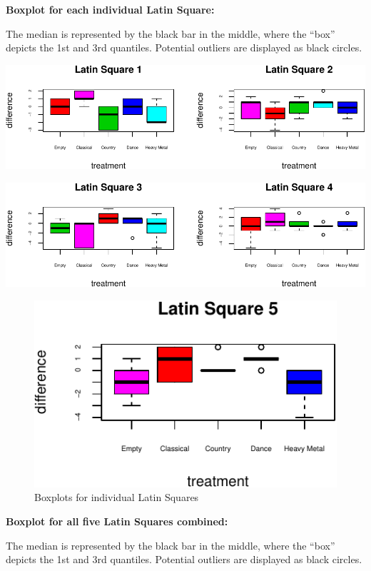 \documentclass[]{article}
\begin{document}
\textbf{Boxplot for each individual Latin Square:}

The median is represented by the black bar in the middle, where the
``box'' depicts the 1st and 3rd quantiles. Potential outliers are
displayed as black circles.

\includegraphics{STATS101B-Project-Code_files/figure-latex/unnamed-chunk-2-1.pdf}

\includegraphics{STATS101B-Project-Code_files/figure-latex/unnamed-chunk-3-1.pdf}

\begin{figure}
\centering
\includegraphics{STATS101B-Project-Code_files/figure-latex/unnamed-chunk-4-1.pdf}
\caption{Boxplots for individual Latin Squares}
\end{figure}

\textbf{Boxplot for all five Latin Squares combined:}

The median is represented by the black bar in the middle, where the
``box'' depicts the 1st and 3rd quantiles. Potential outliers are
displayed as black circles.
\end{document}
